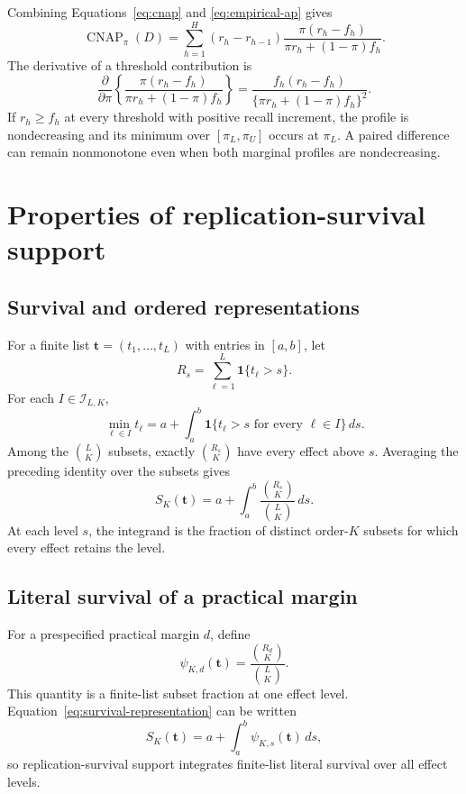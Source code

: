 \documentclass[11pt]{article}
\newcommand{\CNAP}{\operatorname{CNAP}}
\theoremstyle{remark}
\begin{document}
Combining Equations~\eqref{eq:cnap} and \eqref{eq:empirical-ap} gives
\begin{equation}
\CNAP_\pi(D)
=
\sum_{h=1}^{H}
(r_h-r_{h-1})
\frac{\pi(r_h-f_h)}
{\pi r_h+(1-\pi)f_h}.
\label{eq:cnap-profile}
\end{equation}
The derivative of a threshold contribution is
\begin{equation}
\frac{\partial}{\partial\pi}
\left\{
\frac{\pi(r_h-f_h)}
{\pi r_h+(1-\pi)f_h}
\right\}
=
\frac{f_h(r_h-f_h)}
{\{\pi r_h+(1-\pi)f_h\}^2}.
\label{eq:cnap-derivative}
\end{equation}
If $r_h\geq f_h$ at every threshold with positive recall increment, the profile is nondecreasing and its minimum over $[\pi_L,\pi_U]$ occurs at $\pi_L$. A paired difference can remain nonmonotone even when both marginal profiles are nondecreasing.

\section{Properties of replication-survival support}
\label{app:support-proofs}

\subsection{Survival and ordered representations}

For a finite list $\mathbf t=(t_1,\ldots,t_L)$ with entries in $[a,b]$, let
\[
R_s=\sum_{\ell=1}^L\mathbf 1\{t_\ell>s\}.
\]
For each $I\in\mathcal I_{L,K}$,
\[
\min_{\ell\in I}t_\ell
=
a+\int_a^b\mathbf 1\{t_\ell>s\text{ for every }\ell\in I\}\,ds.
\]
Among the $\binom{L}{K}$ subsets, exactly $\binom{R_s}{K}$ have every
effect above $s$. Averaging the preceding identity over the subsets gives
\begin{equation}
S_K(\mathbf t)
=
a+\int_a^b
\frac{\binom{R_s}{K}}{\binom{L}{K}}\,ds.
\label{eq:survival-representation}
\end{equation}
At each level $s$, the integrand is the fraction of distinct order-$K$
subsets for which every effect retains the level.

\subsection{Literal survival of a practical margin}
\label{app:literal-survival}

For a prespecified practical margin $d$, define
\begin{equation}
\psi_{K,d}(\mathbf t)
=
\frac{\binom{R_d}{K}}{\binom{L}{K}}.
\label{eq:literal-survival}
\end{equation}
This quantity is a finite-list subset fraction at one effect level.
Equation~\eqref{eq:survival-representation} can be written
\[
S_K(\mathbf t)=a+\int_a^b\psi_{K,s}(\mathbf t)\,ds,
\]
so replication-survival support integrates finite-list literal survival over
all effect levels.
\end{document}
